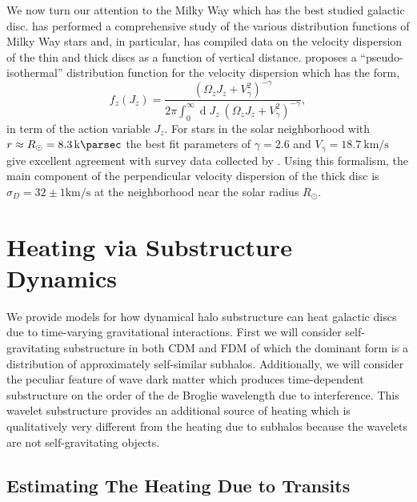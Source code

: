 \documentclass[usenatbib]{mnras}
\renewcommand{\d}[1]{\! \mathrm{d}#1 \:}
\renewcommand{\d}[1]{\ensuremath{\operatorname{d}\!{#1}}}
\begin{document}
\par
We now turn our attention to the Milky Way which has the best studied galactic disc. \cite{milky_way} has performed a comprehensive study of the various distribution functions of Milky Way stars and, in particular, has compiled data on the velocity dispersion of the thin and thick discs as a function of vertical distance. \cite{milky_way} proposes a ``pseudo-isothermal'' distribution function for the velocity dispersion which has the form,
\begin{equation}
f_z(J_z) = \frac{\left( \Omega_z J_z + V_\gamma^2 \right)^{-\gamma}}{2 \pi \int_{0}^{\infty} \d{J_z} \: \left( \Omega_z J_z + V_\gamma^2 \right)^{-\gamma} },
\end{equation}  
in term of the action variable $J_z$. For stars in the solar neighborhood with $r \approx R_{\odot} =  \SI{8.3}{\kilo \parsec}$ the best fit parameters of $\gamma = 2.6$ and $V_\gamma = \SI{18.7}{\kilo \meter \per \second}$ give excellent agreement with survey data collected by \cite{milkyway-thickdisc}. Using this formalism, the main component of the perpendicular velocity dispersion of the thick disc is $\sigma_D = 32 \pm 1 \si{\kilo \meter \per \second}$ at the neighborhood near the solar radius $R_{\odot}$.   



\section{Heating via Substructure Dynamics}

We provide models for how dynamical halo substructure can heat galactic discs due to time-varying gravitational interactions. First we will consider self-gravitating substructure in both CDM and FDM of which the dominant form is a distribution of approximately self-similar subhalos. Additionally, we will consider the peculiar feature of wave dark matter which produces time-dependent substructure on the order of the de Broglie wavelength due to interference. This wavelet substructure provides an additional source of heating which is qualitatively very different from the heating due to subhalos because the wavelets are not self-gravitating objects. 

\subsection{Estimating The Heating Due to Transits}
\end{document}

